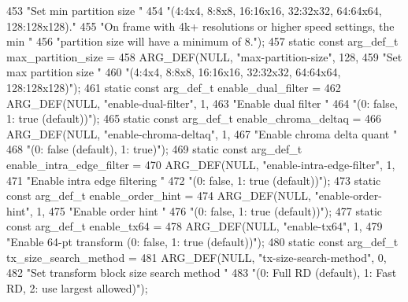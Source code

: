 \begin{DoxyCodeInclude}
{{{{{{{453             \textcolor{stringliteral}{"Set min partition size "}
454             \textcolor{stringliteral}{"(4:4x4, 8:8x8, 16:16x16, 32:32x32, 64:64x64, 128:128x128)."}
455             \textcolor{stringliteral}{"On frame with 4k+ resolutions or higher speed settings, the min "}
456             \textcolor{stringliteral}{"partition size will have a minimum of 8."});
457 \textcolor{keyword}{static} \textcolor{keyword}{const} arg\_def\_t max\_partition\_size =
458     ARG\_DEF(NULL, \textcolor{stringliteral}{"max-partition-size"}, 128,
459             \textcolor{stringliteral}{"Set max partition size "}
460             \textcolor{stringliteral}{"(4:4x4, 8:8x8, 16:16x16, 32:32x32, 64:64x64, 128:128x128)"});
461 \textcolor{keyword}{static} \textcolor{keyword}{const} arg\_def\_t enable\_dual\_filter =
462     ARG\_DEF(NULL, \textcolor{stringliteral}{"enable-dual-filter"}, 1,
463             \textcolor{stringliteral}{"Enable dual filter "}
464             \textcolor{stringliteral}{"(0: false, 1: true (default))"});
465 \textcolor{keyword}{static} \textcolor{keyword}{const} arg\_def\_t enable\_chroma\_deltaq =
466     ARG\_DEF(NULL, \textcolor{stringliteral}{"enable-chroma-deltaq"}, 1,
467             \textcolor{stringliteral}{"Enable chroma delta quant "}
468             \textcolor{stringliteral}{"(0: false (default), 1: true)"});
469 \textcolor{keyword}{static} \textcolor{keyword}{const} arg\_def\_t enable\_intra\_edge\_filter =
470     ARG\_DEF(NULL, \textcolor{stringliteral}{"enable-intra-edge-filter"}, 1,
471             \textcolor{stringliteral}{"Enable intra edge filtering "}
472             \textcolor{stringliteral}{"(0: false, 1: true (default))"});
473 \textcolor{keyword}{static} \textcolor{keyword}{const} arg\_def\_t enable\_order\_hint =
474     ARG\_DEF(NULL, \textcolor{stringliteral}{"enable-order-hint"}, 1,
475             \textcolor{stringliteral}{"Enable order hint "}
476             \textcolor{stringliteral}{"(0: false, 1: true (default))"});
477 \textcolor{keyword}{static} \textcolor{keyword}{const} arg\_def\_t enable\_tx64 =
478     ARG\_DEF(NULL, \textcolor{stringliteral}{"enable-tx64"}, 1,
479             \textcolor{stringliteral}{"Enable 64-pt transform (0: false, 1: true (default))"});
480 \textcolor{keyword}{static} \textcolor{keyword}{const} arg\_def\_t tx\_size\_search\_method =
481     ARG\_DEF(NULL, \textcolor{stringliteral}{"tx-size-search-method"}, 0,
482             \textcolor{stringliteral}{"Set transform block size search method "}
483             \textcolor{stringliteral}{"(0: Full RD (default), 1: Fast RD, 2: use largest allowed)"});
}}}}}}}
\end{DoxyCodeInclude}
